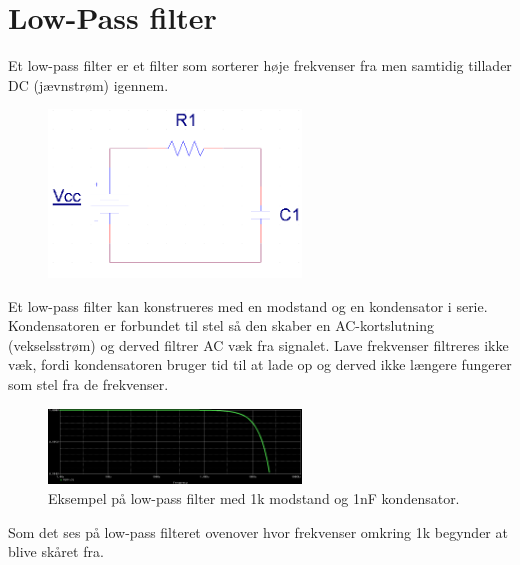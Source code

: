 \section{Low-Pass filter}
\label{lowPassFilter}

Et low-pass filter er et filter som sorterer høje frekvenser fra men samtidig tillader DC (jævnstrøm) igennem.

\begin{figure}[h!]
  \centering
  \includegraphics[width=0.6\textwidth]{figures/low_pass_schematic.png}
\end{figure}

Et low-pass filter kan konstrueres med en modstand og en kondensator i serie. Kondensatoren er forbundet til stel så den skaber en AC-kortslutning (vekselsstrøm) og derved filtrer AC væk fra signalet. 
Lave frekvenser filtreres ikke væk, fordi kondensatoren bruger tid til at lade op og derved ikke længere fungerer som stel fra de frekvenser.

\begin{figure}[h!]
  \centering
  \includegraphics[width=0.6\textwidth]{figures/low_pass_cut_off_frequency.png}
  \caption{Eksempel på low-pass filter med 1k modstand og 1nF kondensator.}
\end{figure}
Som det ses på low-pass filteret ovenover hvor frekvenser omkring 1k begynder at blive skåret fra.
